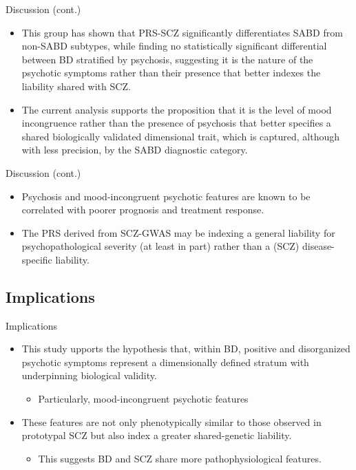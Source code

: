 \documentclass{beamer}
\begin{document}
\begin{frame}{Discussion (cont.)}
    \begin{itemize}
        \item This group has shown that PRS-SCZ significantly differentiates
              SABD from non-SABD subtypes, while finding no statistically
              significant differential between BD stratified by psychosis,
              suggesting it is the nature of the psychotic symptoms rather than
              their presence that better indexes the liability shared with SCZ.
        \item The current analysis supports the proposition that it is the
              level of mood incongruence rather than the presence of psychosis
              that better specifies a shared biologically validated dimensional
              trait, which is captured, although with less precision, by the
              SABD diagnostic category.
    \end{itemize}
\end{frame}

\begin{frame}{Discussion (cont.)}
    \begin{itemize}
        \item Psychosis and mood-incongruent psychotic features are known to be
              correlated with poorer prognosis and treatment response.
        \item The PRS derived from SCZ-GWAS may be indexing a general liability
              for psychopathological severity (at least in part) rather than a
              (SCZ) disease-specific liability.
    \end{itemize}
\end{frame}

\subsection{Implications}
\begin{frame}{Implications}
    \begin{itemize}
        \item This study upports the hypothesis that, within BD, positive and
              disorganized psychotic symptoms represent a dimensionally defined
              stratum with underpinning biological validity.
            \begin{itemize}
                \item Particularly, mood-incongruent psychotic features
            \end{itemize}
        \item These features are not only phenotypically similar to those
              observed in prototypal SCZ but also index a greater
              shared-genetic liability.
            \begin{itemize}
                \item This suggests BD and SCZ share more pathophysiological features.
            \end{itemize}
    \end{itemize}
\end{frame}
\end{document}
